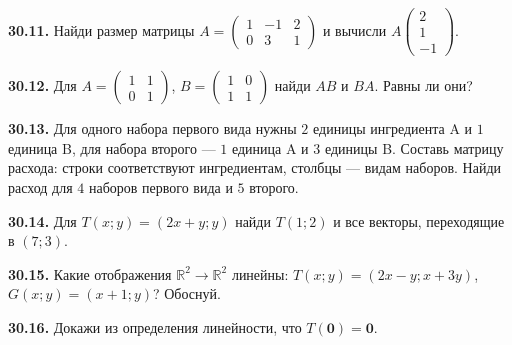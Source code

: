 \noindent\begin{minipage}[t]{\linewidth}\textbf{30.11.} Найди размер матрицы \(A=\begin{pmatrix}1&-1&2\\0&3&1\end{pmatrix}\) и вычисли \(A\begin{pmatrix}2\\1\\-1\end{pmatrix}\).\par\end{minipage}\par
\noindent\begin{minipage}[t]{\linewidth}\textbf{30.12.} Для \(A=\begin{pmatrix}1&1\\0&1\end{pmatrix}\), \(B=\begin{pmatrix}1&0\\1&1\end{pmatrix}\) найди \(AB\) и \(BA\). Равны ли они?\par\end{minipage}\par
\noindent\begin{minipage}[t]{\linewidth}\textbf{30.13.} Для одного набора первого вида нужны \(2\) единицы ингредиента A и \(1\) единица B, для набора второго — \(1\) единица A и \(3\) единицы B. Составь матрицу расхода: строки соответствуют ингредиентам, столбцы — видам наборов. Найди расход для \(4\) наборов первого вида и \(5\) второго.\par\end{minipage}\par
\noindent\begin{minipage}[t]{\linewidth}\textbf{30.14.} Для \(T(x;y)=(2x+y;y)\) найди \(T(1;2)\) и все векторы, переходящие в \((7;3)\).\par\end{minipage}\par
\noindent\begin{minipage}[t]{\linewidth}\textbf{30.15.} Какие отображения \(\mathbb R^2\to\mathbb R^2\) линейны: \(T(x;y)=(2x-y;x+3y)\), \(G(x;y)=(x+1;y)\)? Обоснуй.\par\end{minipage}\par
\noindent\begin{minipage}[t]{\linewidth}\textbf{30.16.} Докажи из определения линейности, что \(T(\symbf0)=\symbf0\).\par\end{minipage}\par
